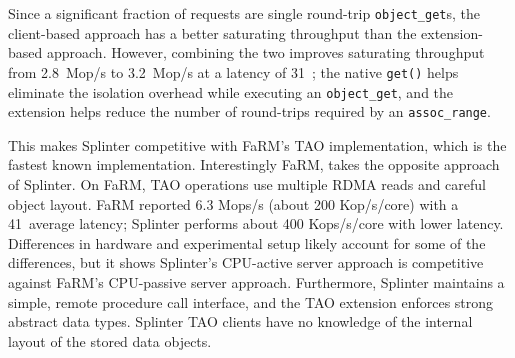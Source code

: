Since a significant fraction of requests are single round-trip
\texttt{object\_get}s, the client-based approach has a better
saturating throughput than the extension-based approach. However,
combining the two improves
saturating throughput from 2.8~Mop/s to 3.2~Mop/s at a latency of
31~\us;
the native \texttt{get()} helps eliminate the isolation
overhead while executing an \texttt{object\_get}, and the extension helps
reduce the number of round-trips required by an \texttt{assoc\_range}.

This makes Splinter competitive with FaRM's TAO implementation, which is the
  fastest known implementation.
Interestingly FaRM, takes the opposite approach of Splinter.
On FaRM, TAO operations use multiple RDMA reads and careful
  object layout.
FaRM reported 6.3 Mops/s (about 200 Kop/s/core) with a 41~\us average latency;
  Splinter performs about 400 Kops/s/core with lower latency.
Differences in hardware and experimental setup likely account for some
  of the differences, but it shows Splinter's CPU-active server approach
  is competitive against FaRM's CPU-passive server approach.
Furthermore, Splinter maintains a simple, remote procedure call interface, and
the TAO extension enforces strong abstract data types.
Splinter TAO clients have no knowledge of the internal layout of the stored
  data objects.
